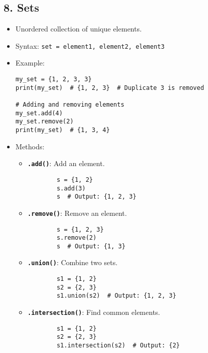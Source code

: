 \subsection*{8. Sets}
\begin{itemize}
    \item Unordered collection of unique elements.
    \item Syntax: \texttt{set = {element1, element2, element3}}
    \item Example:
    \begin{verbatim}
my_set = {1, 2, 3, 3}
print(my_set)  # {1, 2, 3}  # Duplicate 3 is removed

# Adding and removing elements
my_set.add(4)
my_set.remove(2)
print(my_set)  # {1, 3, 4}
    \end{verbatim}
    \item Methods:
    \begin{itemize}
        \item \textbf{\texttt{.add()}}: Add an element.
        \begin{verbatim}
        s = {1, 2}
        s.add(3)
        s  # Output: {1, 2, 3}
        \end{verbatim}
        \item \textbf{\texttt{.remove()}}: Remove an element.
        \begin{verbatim}
        s = {1, 2, 3}
        s.remove(2)
        s  # Output: {1, 3}
        \end{verbatim}
        \item \textbf{\texttt{.union()}}: Combine two sets.
        \begin{verbatim}
        s1 = {1, 2}
        s2 = {2, 3}
        s1.union(s2)  # Output: {1, 2, 3}
        \end{verbatim}
        \item \textbf{\texttt{.intersection()}}: Find common elements.
        \begin{verbatim}
        s1 = {1, 2}
        s2 = {2, 3}
        s1.intersection(s2)  # Output: {2}
        \end{verbatim}
    \end{itemize}
\end{itemize}

